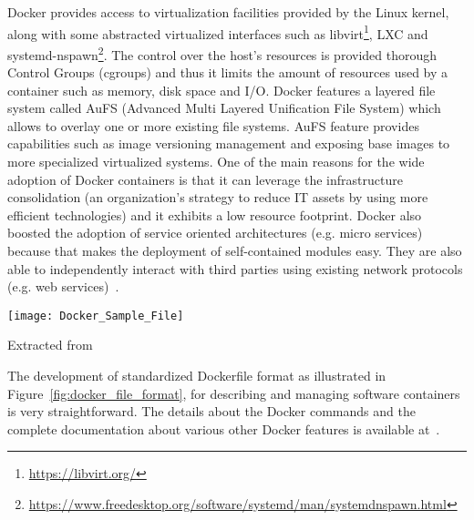 Docker provides access to virtualization facilities provided by the 
Linux kernel, along with some abstracted virtualized interfaces such as 
libvirt\footnote{\url{https://libvirt.org/}}, LXC and 
systemd-nspawn\footnote{\url{https://www.freedesktop.org/software/systemd/man/systemdnspawn.html}}. 
The control over the host's resources is provided thorough Control 
Groups (cgroups) and thus it limits the amount of resources used by a 
container such as memory, disk space and I/O. Docker features a layered 
file system called AuFS (Advanced Multi Layered Unification File 
System) which allows to overlay one or more existing file systems. AuFS 
feature provides capabilities such as image versioning management and 
exposing base images to more specialized virtualized systems. One of 
the main reasons for the wide adoption of Docker containers is that it 
can leverage the infrastructure consolidation (an organization's 
strategy to reduce IT assets by using more efficient technologies) and 
it exhibits a low resource footprint. Docker also boosted the adoption 
of service oriented architectures (e.g. micro services) because that 
makes the deployment of self-contained modules easy. They are also able 
to independently interact with third parties using existing network 
protocols (e.g. web services)~\cite{Xavier:2013:PEC:2497369.2497577}. 


\begin{center}
\texttt{[image: Docker\_Sample\_File]}
\label{fig:docker_file_format}
\caption*{Extracted from \cite{docker-file-format}}
\end{center}

The development of standardized Dockerfile format as illustrated in 
Figure~\ref{fig:docker_file_format}, for describing and managing 
software containers is very straightforward. The details about the Docker commands and the complete 
documentation about various other Docker features is available at~\cite{docker_commands}.

